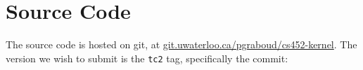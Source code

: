 \documentclass{article}
\begin{document}
\pagebreak

\section{Source Code}
The source code is hosted on git, at \url{git.uwaterloo.ca/pgraboud/cs452-kernel}.
The version we wish to submit is the \texttt{tc2} tag, specifically
the commit:

\end{document}
